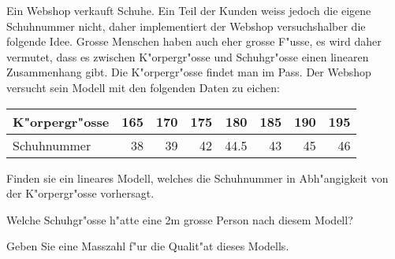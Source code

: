 Ein Webshop verkauft Schuhe.
Ein Teil der Kunden weiss jedoch die eigene Schuhnummer nicht, 
daher implementiert der Webshop versuchshalber die folgende Idee.
Grosse Menschen haben auch eher grosse F"usse, es wird daher vermutet,
dass es zwischen K"orpergr"osse und Schuhgr"osse einen linearen
Zusammenhang gibt. 
Die K"orpergr"osse findet man im Pass.
Der Webshop versucht sein Modell mit den folgenden Daten zu
eichen:
\begin{center}
\begin{tabular}{lrrrrrrr}
K"orpergr"osse&165&170&175&180  &185&190&195\\
\hline
Schuhnummer   & 38& 39& 42& 44.5& 43& 45&46
\end{tabular}
\end{center}
\begin{teilaufgaben}
\item Finden sie ein lineares Modell, welches die Schuhnummer in
Abh"angigkeit von der K"orpergr"osse vorhersagt.
\item Welche Schuhgr"osse h"atte eine 2m grosse Person nach diesem Modell?
\item Geben Sie eine Masszahl f"ur die Qualit"at dieses Modells.
\end{teilaufgaben}

